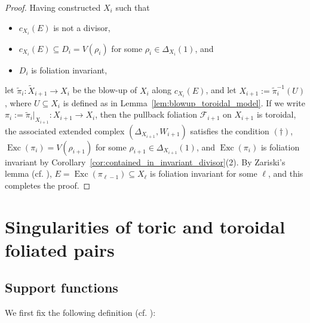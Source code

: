 \documentclass[12pt,reqno]{amsart}
\theoremstyle{definition}
\newcommand{\on}{\operatorname}
\newcommand\cF{{\mathcal{F}}}
\begin{document}
\begin{proof}
    Having constructed $X_i$ such that 
    \begin{itemize}
        \item $c_{X_i}(E)$ is not a divisor,
        \item $c_{X_i}(E)\subseteq D_i=V(\rho_i)$ for some $\rho_i\in\Delta_{X_i}(1)$, and 
        \item $D_i$ is foliation invariant,
    \end{itemize}
    let $\widetilde\pi_i\colon \widetilde X_{i+1}\to X_i$ be the blow-up of $X_i$ along $c_{X_i}(E)$, and let $X_{i+1}:=\widetilde\pi_i^{-1}(U)$, where $U\subseteq X_i$ is defined as in Lemma~\ref{lem:blowup_toroidal_model}. If we write $\pi_i:=\widetilde\pi_i\vert_{X_{i+1}}\colon X_{i+1}\to X_i$, then the pullback foliation $\cF_{i+1}$ on $X_{i+1}$ is toroidal, the associated extended complex $(\Delta_{X_{i+1}},W_{i+1})$ satisfies the condition $(\dagger)$, $\on{Exc}(\pi_{i})=V(\rho_{i+1})$ for some $\rho_{i+1}\in\Delta_{X_{i+1}}(1)$, and $\on{Exc}(\pi_{i})$ is foliation invariant by Corollary~\ref{cor:contained_in_invariant_divisor}(2). By Zariski's lemma (cf. \cite[Lemma 2.45]{KM98}), $E=\on{Exc}(\pi_{\ell-1})\subseteq X_\ell$ is foliation invariant for some $\ell$, and this completes the proof.
\end{proof}



\section{Singularities of toric and toroidal foliated pairs}\label{sec:Singularities}
\subsection{Support functions}
We first fix the following definition (cf. \cite[Definition 4.2.11]{CLS11}):
\end{document}
